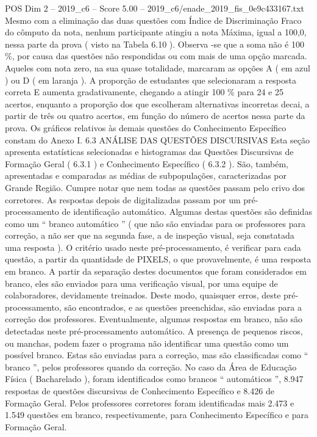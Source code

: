 \begin{textsample}{POS Dim 2 – 2019\_c6 – Score 5.00 – 2019\_c6/enade\_2019\_fis\_0e9c433167.txt}
Mesmo com a eliminação das duas questões com Índice de Discriminação Fraco do cômputo da nota, nenhum participante atingiu a nota Máxima, igual a 100,0, nessa parte da prova ( visto na Tabela 6.10 ).
Observa -se que a soma não é 100 \%, por causa das questões não respondidas ou com mais de uma opção marcada.
Aqueles com nota zero, na sua quase totalidade, marcaram as opções A ( em azul ) ou D ( em laranja ).
A proporção de estudantes que selecionaram a resposta correta E aumenta gradativamente, chegando a atingir 100 \% para 24 e 25 acertos, enquanto a proporção dos que escolheram alternativas incorretas decai, a partir de três ou quatro acertos, em função do número de acertos nessa parte da prova.
Os gráficos relativos às demais questões do Conhecimento Específico constam do Anexo I. 6.3 ANÁLISE DAS QUESTÕES DISCURSIVAS Esta seção apresenta estatísticas selecionadas e histogramas das Questões Discursivas de Formação Geral ( 6.3.1 ) e Conhecimento Específico ( 6.3.2 ).
São, também, apresentadas e comparadas as médias de subpopulações, caracterizadas por Grande Região.
Cumpre notar que nem todas as questões passam pelo crivo dos corretores.
As respostas depois de digitalizadas passam por um pré-processamento de identificação automático.
Algumas destas questões são definidas como um “ branco automático ” ( que não são enviadas para os professores para correção, a não ser que na segunda fase, a de inspeção visual, seja constatada uma resposta ).
O critério usado neste pré-processamento, é verificar para cada questão, a partir da quantidade de PIXELS, o que provavelmente, é uma resposta em branco.
A partir da separação destes documentos que foram considerados em branco, eles são enviados para uma verificação visual, por uma equipe de colaboradores, devidamente treinados.
Deste modo, quaisquer erros, deste pré-processamento, são encontrados, e as questões preenchidas, são enviadas para a correção dos professores.
Eventualmente, algumas respostas em branco, não são detectadas neste pré-processamento automático.
A presença de pequenos riscos, ou manchas, podem fazer o programa não identificar uma questão como um possível branco.
Estas são enviadas para a correção, mas são classificadas como “ branco ”, pelos professores quando da correção.
No caso da Área de Educação Física ( Bacharelado ), foram identificados como brancos “ automáticos ”, 8.947 respostas de questões discursivas de Conhecimento Específico e 8.426 de Formação Geral.
Pelos professores corretores foram identificadas mais 2.473 e 1.549 questões em branco, respectivamente, para Conhecimento Específico e para Formação Geral.

\end{textsample}
